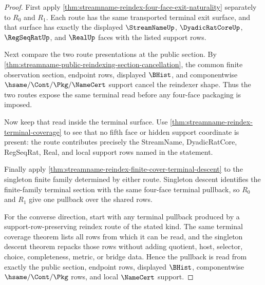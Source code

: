\begin{proof}
First apply
\autoref{thm:streamname-reindex-four-face-exit-naturality} separately to
$R_0$ and $R_1$. Each route has the same transported terminal exit surface,
and that surface has exactly the displayed $\StreamNameUp$,
$\DyadicRatCoreUp$, $\RegSeqRatUp$, and $\RealUp$ faces with the listed support
rows.

Next compare the two route presentations at the public section. By
\autoref{thm:streamname-public-reindexing-section-cancellation}, the common
finite observation section, endpoint rows, displayed $\BHist$, and
componentwise $\hsame/\Cont/\Pkg/\NameCert$ support cancel the reindexer
shape. Thus the two routes expose the same terminal read before any
four-face packaging is imposed.

Now keep that read inside the terminal surface. Use
\autoref{thm:streamname-reindex-terminal-coverage} to see that no fifth face
or hidden support coordinate is present: the route contributes precisely the
StreamName, DyadicRatCore, RegSeqRat, Real, and local support rows named in
the statement.

Finally apply
\autoref{thm:streamname-reindex-finite-cover-terminal-descent} to the
singleton finite family determined by either route. Singleton descent
identifies the finite-family terminal section with the same four-face
terminal pullback, so $R_0$ and $R_1$ give one pullback over the shared rows.

For the converse direction, start with any terminal pullback produced by a
support-row-preserving reindex route of the stated kind. The same terminal
coverage theorem lists all rows from which it can be read, and the singleton
descent theorem repacks those rows without adding quotient, host, selector,
choice, completeness, metric, or bridge data. Hence the pullback is read from
exactly the public section, endpoint rows, displayed $\BHist$,
componentwise $\hsame/\Cont/\Pkg$ rows, and local $\NameCert$ support.
\end{proof}

